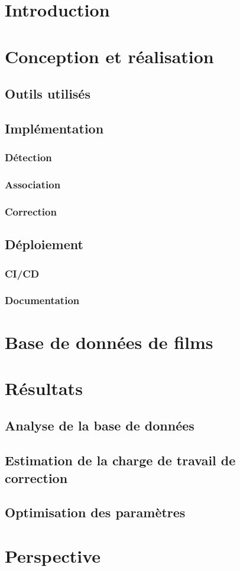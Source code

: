\chapter{Introduction}


\chapter{Conception et réalisation}

	\section{Outils utilisés}
	
	\section{Implémentation}
		\subsection{Détection}
		\subsection{Association}
		\subsection{Correction}
		
	\section{Déploiement}
		\subsection{CI/CD}
		\subsection{Documentation}

		
\chapter{Base de données de films}


\chapter{Résultats}

	\section{Analyse de la base de données}
	
	\section{Estimation de la charge de travail de correction}
	
	\section{Optimisation des paramètres}
	
	
\chapter{Perspective}